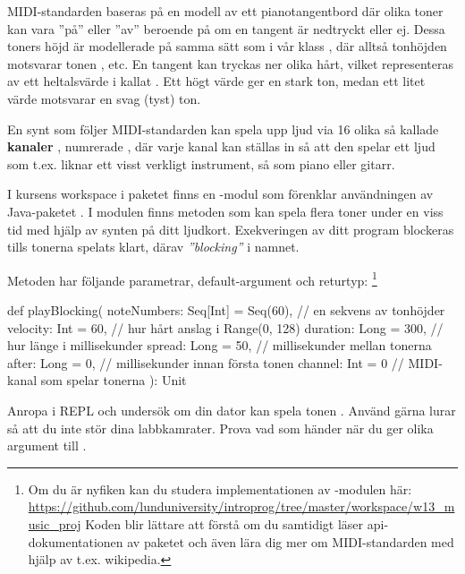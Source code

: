 {MIDI-standarden baseras på en modell av ett pianotangentbord där olika toner kan vara ''på'' eller ''av'' beroende på om en tangent är nedtryckt eller ej. Dessa toners höjd är modellerade på samma sätt som i vår klass , där alltså tonhöjden  motsvarar tonen , etc. En tangent kan tryckas ner olika hårt, vilket representeras av ett heltalsvärde i  kallat . Ett högt värde ger en stark ton, medan ett litet värde motsvarar en svag (tyst) ton.

En synt som följer MIDI-standarden kan spela upp ljud via 16 olika så kallade \textbf{kanaler} , numrerade ,  där varje kanal kan ställas in så att den spelar ett ljud som t.ex. liknar ett visst verkligt instrument, så som piano eller gitarr.

I kursens workspace i paketet  finns en -modul som förenklar användningen av Java-paketet . I modulen  finns metoden  som kan spela flera toner under en viss tid med hjälp av synten på ditt ljudkort. Exekveringen av ditt program  blockeras tills tonerna spelats klart, därav \emph{''blocking''} i namnet.

Metoden  har följande parametrar, default-argument och returtyp:
\footnote{Om du är nyfiken kan du studera implementationen av -modulen här:
\\\url{https://github.com/lunduniversity/introprog/tree/master/workspace/w13_music_proj}
 Koden blir lättare att förstå om du samtidigt läser api-dokumentationen av paketet  och även lära dig mer om MIDI-standarden med hjälp av t.ex. wikipedia.}

\begin{Code}
def playBlocking(
  noteNumbers: Seq[Int] = Seq(60), // en sekvens av tonhöjder
  velocity: Int         = 60,      // hur hårt anslag i Range(0, 128)
  duration: Long        = 300,     // hur länge i millisekunder
  spread:   Long        = 50,      // millisekunder mellan tonerna
  after:    Long        = 0,       // millisekunder innan första tonen
  channel:  Int         = 0        // MIDI-kanal som spelar tonerna
): Unit
\end{Code}


\Task Anropa  i REPL och undersök om din dator kan spela tonen . Använd gärna lurar så att du inte stör dina labbkamrater. Prova vad som händer när du ger olika argument till .

}
